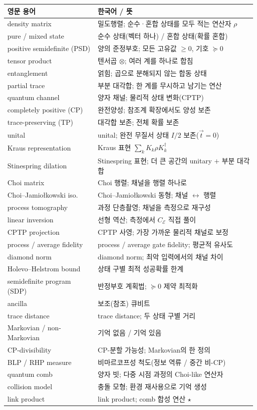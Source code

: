 \documentclass[11pt,a4paper]{article}
\newcommand{\E}{\mathcal{E}}
\theoremstyle{definition}
\theoremstyle{plain}
\theoremstyle{remark}
\begin{document}
\begin{longtable}{p{}p{}}
\toprule
영문 용어 & 한국어 / 뜻 \\
\midrule
\endhead
density matrix & 밀도행렬; 순수·혼합 상태를 모두 적는 연산자 $\rho$ \\
pure / mixed state & 순수 상태(벡터 하나) / 혼합 상태(확률 혼합) \\
positive semidefinite (PSD) & 양의 준정부호; 모든 고유값 $\ge0$, 기호 $\succeq0$ \\
tensor product & 텐서곱 $\otimes$; 여러 계를 하나로 합침 \\
entanglement & 얽힘; 곱으로 분해되지 않는 합동 상태 \\
partial trace & 부분 대각합; 한 계를 무시하고 남기는 연산 \\
quantum channel & 양자 채널; 물리적 상태 변화(CPTP) \\
completely positive (CP) & 완전양성; 참조계 확장에서도 양성 보존 \\
trace-preserving (TP) & 대각합 보존; 전체 확률 보존 \\
unital & unital; 완전 무질서 상태 $I/2$ 보존($\vec t=0$) \\
Kraus representation & Kraus 표현 $\sum_k K_k\rho K_k^\dagger$ \\
Stinespring dilation & Stinespring 표현; 더 큰 공간의 unitary $+$ 부분 대각합 \\
Choi matrix & Choi 행렬; 채널을 행렬 하나로 \\
Choi--Jamio{\l}kowski iso. & Choi--Jamio{\l}kowski 동형; 채널 $\leftrightarrow$ 행렬 \\
process tomography & 과정 단층촬영; 채널을 측정으로 재구성 \\
linear inversion & 선형 역산; 측정에서 $C_\E$ 직접 풀이 \\
CPTP projection & CPTP 사영; 가장 가까운 물리적 채널로 보정 \\
process / average fidelity & process / average gate fidelity; 평균적 유사도 \\
diamond norm & diamond norm; 최악 입력에서의 채널 차이 \\
Holevo--Helstrom bound & 상태 구별 최적 성공확률 한계 \\
semidefinite program (SDP) & 반정부호 계획법; $\succeq0$ 제약 최적화 \\
ancilla & 보조(참조) 큐비트 \\
trace distance & trace distance; 두 상태 구별 거리 \\
Markovian / non-Markovian & 기억 없음 / 기억 있음 \\
CP-divisibility & CP-분할 가능성; Markovian의 한 정의 \\
BLP / RHP measure & 비마르코프성 척도(정보 역류 / 중간 비-CP) \\
quantum comb & 양자 빗; 다중 시점 과정의 Choi-like 연산자 \\
collision model & 충돌 모형; 환경 재사용으로 기억 생성 \\
link product & link product; comb 합성 연산 $\star$ \\
\bottomrule
\end{longtable}
\end{document}
